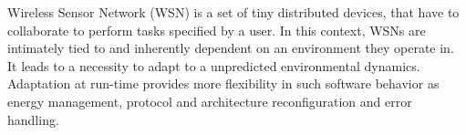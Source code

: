 
Wireless Sensor Network (WSN) is a set of tiny distributed devices, that have 
to collaborate to perform tasks specified by a user. In this context, WSNs are
intimately tied to and inherently dependent on an environment they operate in.
It leads to a necessity to adapt to a unpredicted environmental dynamics.
Adaptation at run-time provides more flexibility in such software behavior as
energy management, protocol and architecture reconfiguration and error handling.

